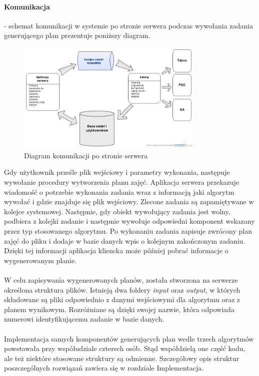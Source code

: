 \paragraph{Komunikacja} - schemat komunikacji w systemie po stronie serwera podczas wywołania zadania generującego plan prezentuje poniższy diagram.
\begin{figure}[H]
  \caption{Diagram komunikacji po stronie serwera}
  \centering
    \includegraphics[width=0.8\textwidth]{img/SystemCommunication.png}
\end{figure}
Gdy użytkownik prześle plik wejściowy i parametry wykonania, następuje wywołanie procedury wytworzenia planu zajęć. Aplikacja serwera przekazuje wiadomość o potrzebie wykonania zadania wraz z informacją jaki algorytm wywołać i gdzie znajduje się plik wejściowy. Zlecone zadania są zapamiętywane w kolejce systemowej. Następnie, gdy obiekt wywołujący zadania jest wolny, podbiera z kolejki zadanie i następnie wywołuje odpowiedni komponent wskazany przez typ stosowanego algorytmu. Po wykonaniu zadania zapisuje zwrócony plan zajęć do pliku i dodaje w bazie danych wpis o kolejnym zakończonym zadaniu. Dzięki tej informacji aplikacja kliencka może później pobrać informacje o wygenerowanym planie.
\paragraph{}W celu zapisywania wygenerowanych planów, została stworzona  na serwerze określona struktura plików. Istnieją dwa foldery \emph{input} oraz \emph{output}, w których składowane są pliki odpowiednio z danymi wejściowymi dla algorytmu oraz z planem wynikowym. Rozróżniane są dzięki swojej nazwie, która odpowiada numerowi identyfikującemu zadanie w bazie danych.
\paragraph{} Implementacja samych komponentów generujących plan wedle trzech algorytmów powstawała przy współudziale czterech osób. Stąd współdzielą one część kodu, ale też niektóre stosowane struktury są odmienne. Szczegółowy opis struktur poszczególnych rozwiązań zawiera się w rozdziale Implementacja.